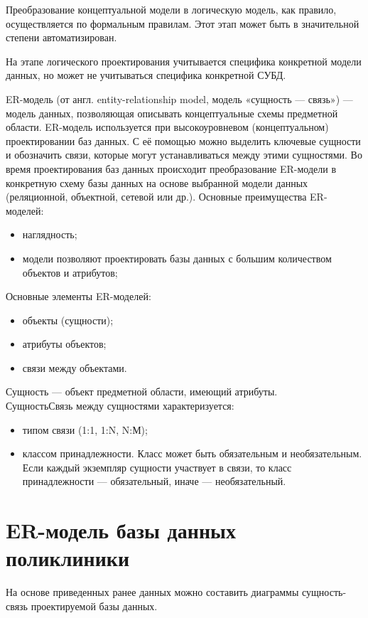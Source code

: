 \documentclass[14pt,a4paper,russian]{extreport}
\begin{document}
Преобразование концептуальной модели в логическую модель, как правило, осуществляется по
формальным правилам. Этот этап может быть в значительной степени автоматизирован.

На этапе логического проектирования учитывается специфика конкретной модели данных, но может
не учитываться специфика конкретной СУБД. 

ER-модель (от англ. entity-relationship model, модель «сущность — связь») — модель данных,
позволяющая описывать концептуальные схемы предметной области.  ER-модель используется при
высокоуровневом (концептуальном) проектировании баз данных. С её помощью можно выделить ключевые
сущности и обозначить связи, которые могут устанавливаться между этими сущностями.  Во время
проектирования баз данных происходит преобразование ER-модели в конкретную схему базы
данных на основе выбранной модели данных (реляционной, объектной, сетевой или др.).\cite{dbdesign}
\newpage
\noindent Основные преимущества ER-моделей:
\begin{itemize}[noitemsep]
    \item наглядность; 
    \item модели позволяют проектировать базы данных с большим количеством объектов и
        атрибутов;
\end{itemize}

\noindent Основные элементы ER-моделей:
\begin{itemize}[noitemsep]
    \item объекты (сущности);
    \item атрибуты объектов;
    \item связи между объектами.
\end{itemize}
\noindent Сущность — объект предметной области, имеющий атрибуты.\\
\noindent СущностьСвязь между сущностями характеризуется:
\begin{itemize}[noitemsep]
    \item типом связи (1:1, 1:N, N:М); 
    \item классом принадлежности. Класс может быть
        обязательным и необязательным. Если каждый экземпляр сущности участвует
        в связи, то класс принадлежности — обязательный, иначе — необязательный.
\end{itemize}


\section{ER-модель базы данных поликлиники}
На основе приведенных ранее данных можно составить диаграммы сущность-связь проектируемой базы
данных.
\end{document}
